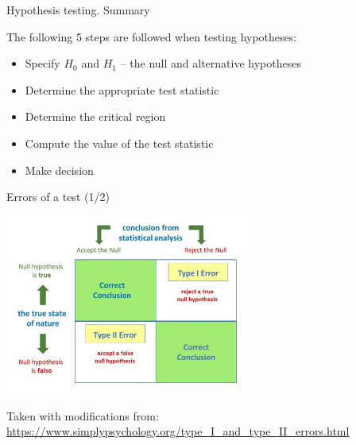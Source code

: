 \documentclass{beamer}
\begin{document}


\begin{frame}
{\centerline{Hypothesis testing. Summary}}

The following 5 steps are followed when testing hypotheses:
\begin{itemize}
\item Specify $H_0$ and $H_1$ -- the null and alternative hypotheses
\item Determine the appropriate test statistic
\item Determine the critical region
\item Compute the value of the test statistic
\item Make decision
\end{itemize}

\end{frame}


\begin{frame}
{\centerline{Errors of a test (1/2)}}

\begin{center}
\includegraphics[width=8cm]{A2022.IDSEPC.SperimentazioneDeduzione/type-1-and-2-errors.jpg}
\end{center}

\vspace*{0.5cm}
\begin{center}
\tiny
Taken with modifications from: \url{https://www.simplypsychology.org/type_I_and_type_II_errors.html}
\end{center}

\end{frame}
\end{document}
